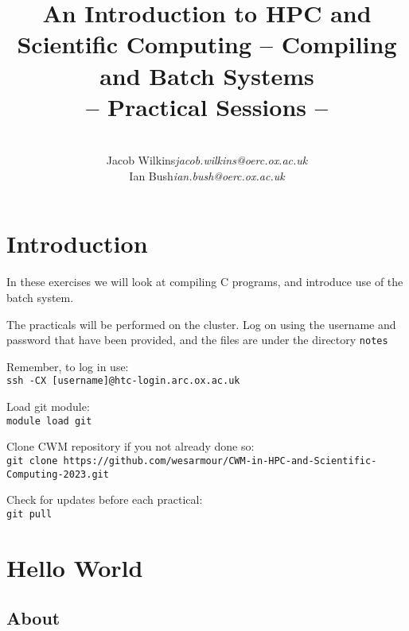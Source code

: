 \documentclass[a4paper, 12pt]{article}
\title{{\Huge\bf An Introduction to HPC and Scientific Computing -- Compiling and Batch Systems} \\ {\huge -- Practical Sessions --}}
\date{}
\author{\bf
  \begin{tabular}{ll}
    Jacob Wilkins & {\em jacob.wilkins@oerc.ox.ac.uk} \\
    Ian Bush   & {\em ian.bush@oerc.ox.ac.uk}
  \end{tabular}
}
\def \cc   {\tt }               %
\begin{document}
\maketitle

\vfill

\tableofcontents

\newpage


\section{Introduction}
\label{Introduction}

In these exercises we will look at compiling C programs, and introduce use of the batch system.

The practicals will be performed on the cluster. Log on using the username and password that have been provided, and the files are under the directory {\cc notes}

Remember, to log in use: \\
{\cc ssh -CX [username]@htc-login.arc.ox.ac.uk}

Load git module: \\
{\cc module load git}

Clone CWM repository if you not already done so: \\
{\cc  git clone https://github.com/wesarmour/CWM-in-HPC-and-Scientific-Computing-2023.git}

Check for updates before each practical: \\
{\cc git pull}



\section{Hello World}
\label{basics}

\subsection*{About}
\end{document}
